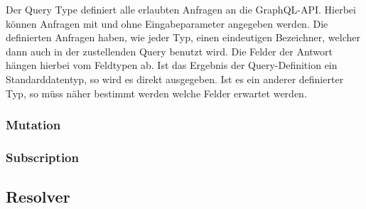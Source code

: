 Der Query Type definiert alle erlaubten Anfragen an die GraphQL-API.
Hierbei können Anfragen mit und ohne Eingabeparameter angegeben werden.
Die definierten Anfragen haben, wie jeder Typ, einen eindeutigen Bezeichner, welcher dann auch in der zustellenden Query
benutzt wird.
Die Felder der Antwort hängen hierbei vom Feldtypen ab. Ist das Ergebnis der Query-Definition ein Standarddatentyp, so wird
es direkt ausgegeben. Ist es ein anderer definierter Typ, so müss näher bestimmt werden welche Felder erwartet werden.


\subsubsection{Mutation}



\subsubsection{Subscription}



\subsection{Resolver}

